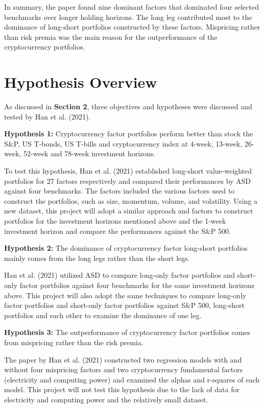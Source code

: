 \documentclass{article}
\begin{document}
In summary, the paper found nine dominant factors that dominated four selected benchmarks over longer holding horizons. The long leg contributed most to the dominance of long-short portfolios constructed by these factors. Mispricing rather than risk premia was the main reason for the outperformance of the cryptocurrency portfolios.

\hypertarget{hypothesis-overview}{%
\section{Hypothesis Overview}\label{hypothesis-overview}}

As discussed in {\bf Section 2}, three objectives and hypotheses were discussed and tested by Han et al. (2021).

{\bf Hypothesis 1:} Cryptocurrency factor portfolios perform better than stock the S\&P, US T-bonds, US T-bills and cryptocurrency index at 4-week, 13-week, 26-week, 52-week and 78-week investment horizons.

To test this hypothesis, Han et al. (2021) established long-short value-weighted portfolios for 27 factors respectively and compared their performances by ASD against four benchmarks. The factors included the various factors used to construct the portfolios, such as size, momentum, volume, and volatility.  Using a new dataset, this project will adopt a similar approach and factors to construct portfolios for the investment horizons mentioned above and the 1-week investment horizon and compare the performances against the S\&P 500.

{\bf Hypothesis 2:} The dominance of cryptocurrency factor long-short portfolios mainly comes from the long legs rather than the short legs.

Han et al. (2021) utilized ASD to compare long-only factor portfolios and short-only factor portfolios against four benchmarks for the same investment horizons above. This project will also adopt the same techniques to compare long-only factor portfolios and short-only factor portfolios against S\&P 500, long-short portfolios and each other to examine the dominance of one leg. 

{\bf Hypothesis 3:} The outperformance of cryptocurrency factor portfolios comes from mispricing rather than the risk premia.

The paper by Han et al. (2021) constructed two regression models with and without four mispricing factors and two cryptocurrency fundamental factors (electricity and computing power) and examined the alphas and r-squares of each model. This project will not test this hypothesis due to the lack of data for electricity and computing power and the relatively small dataset.
\end{document}
